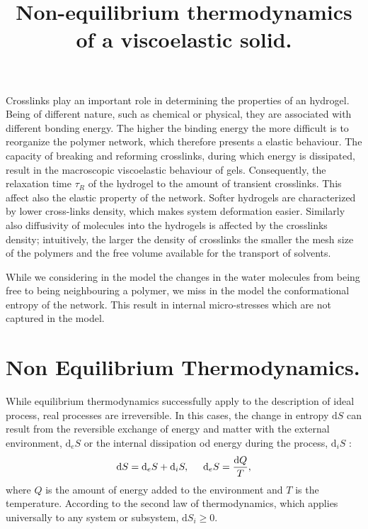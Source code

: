 \documentclass[12pt]{extarticle}
\title{Non-equilibrium thermodynamics of a viscoelastic solid.}
\author{}
\renewcommand{\d}{\ensuremath{\text{d}}}
\begin{document}
\maketitle
Crosslinks play an important role in determining the properties of an hydrogel. Being of different nature, such as chemical or physical, they are associated with different bonding energy. The higher the binding energy the more difficult is to reorganize the polymer network, which therefore presents a elastic behaviour. The capacity of breaking and reforming crosslinks, during which energy is dissipated, result in the macroscopic viscoelastic behaviour of gels. Consequently, the relaxation time $\tau_R$ of the hydrogel to the amount of transient crosslinks. This affect also the elastic property of the network. Softer hydrogels are characterized by lower cross-links density, which makes system deformation easier. Similarly also diffusivity of molecules into the hydrogels is affected by the crosslinks density; intuitively, the larger the density of crosslinks the smaller the mesh size of the polymers and the free volume available for the transport of solvents. 

While we considering in the model the changes in the water molecules from being free to being neighbouring a polymer, we miss in the model the conformational entropy of the network. This result in internal micro-stresses which are not captured in the model.  

\section{Non Equilibrium Thermodynamics.}
While equilibrium thermodynamics successfully apply to the description of ideal process, real processes are irreversible. In this cases, the change in entropy $\d S$ can result from the reversible exchange of energy and matter with the external environment, $\d_eS$ or the internal dissipation od energy during the process, $\d_iS$ \cite{NET}:
\begin{equation}
\d S = \d_eS + \d_iS, \hspace{5mm} \d_eS= \frac{\d Q}{T},
\end{equation}
where $Q$ is the amount of energy added to the environment and $T$ is the temperature. 
According to the second law of thermodynamics, which applies universally to any system or subsystem, $\d S_i\ge 0$.
\end{document}
